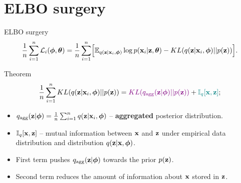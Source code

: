 \section{ELBO surgery}
\begin{frame}{ELBO surgery}
	\vspace{-0.3cm}
	\[
	    \frac{1}{n} \sum_{i=1}^n \mathcal{L}_i(\boldsymbol{\phi}, \boldsymbol{\theta}) = \frac{1}{n} \sum_{i=1}^n \Bigl[ \mathbb{E}_{q(\mathbf{z} | \mathbf{x}_i, \boldsymbol{\phi})} \log p(\mathbf{x}_i | \mathbf{z}, \boldsymbol{\theta}) - KL(q(\mathbf{z} | \mathbf{x}_i, \boldsymbol{\phi}) || p(\mathbf{z})) \Bigr].
	\]
	\vspace{-0.3cm}
	\begin{block}{Theorem}
		\vspace{-0.5cm}
		\[
		    \frac{1}{n} \sum_{i=1}^n KL(q(\mathbf{z} | \mathbf{x}_i, \boldsymbol{\phi}) || p(\mathbf{z})) = {\color{violet} KL(q_{\text{agg}}(\mathbf{z} | \boldsymbol{\phi}) || p(\mathbf{z}))} + {\color{teal}\mathbb{I}_{q} [\mathbf{x}, \mathbf{z}]};
		\]
		\vspace{-0.5cm}
		\begin{itemize}
			\item $q_{\text{agg}}(\mathbf{z} | \boldsymbol{\phi}) = \frac{1}{n} \sum_{i=1}^n q(\mathbf{z} | \mathbf{x}_i, \boldsymbol{\phi})$ -- \textbf{aggregated} posterior distribution.
			\item $\mathbb{I}_{q} [\mathbf{x}, \mathbf{z}]$ -- mutual information between $\mathbf{x}$ and $\mathbf{z}$ under empirical data distribution and distribution $q(\mathbf{z} | \mathbf{x}, \boldsymbol{\phi})$.
			\item  {\color{violet} First term} pushes $q_{\text{agg}}(\mathbf{z} | \boldsymbol{\phi})$ towards the prior $p(\mathbf{z})$.
			\item {\color{teal}Second term} reduces the amount of	information about $\mathbf{x}$ stored in $\mathbf{z}$. 
		\end{itemize}
	\end{block}
\end{frame}
